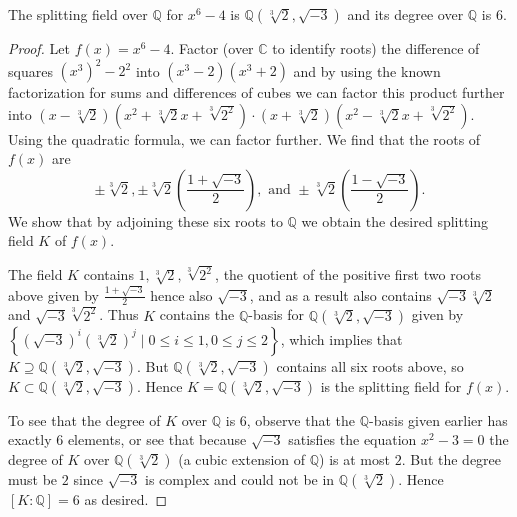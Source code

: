 \documentclass[11pt]{article}
\newcommand{\br}[1]{\left(#1\right)}
\newcommand{\cbr}[1]{\left\{#1\right\}}
\begin{document}
\begin{enumerate}
    The splitting field over $\mathbb{Q}$ for $x^6-4$ is $\mathbb{Q}(\sqrt[3]{2}, \sqrt{-3})$ and its degree over $\mathbb{Q}$ is $6$. \begin{proof}
        Let $f(x) = x^6-4$. Factor (over $\mathbb{C}$ to identify roots) the difference of squares $(x^3)^2-2^2$ into $(x^3-2)(x^3+2)$ and by using the known factorization for sums and differences of cubes we can factor this product further into $(x-\sqrt[3]{2})(x^2 + \sqrt[3]{2}x + \sqrt[3]{2^2})\cdot (x+\sqrt[3]{2})(x^2 - \sqrt[3]{2}x + \sqrt[3]{2^2})$. Using the quadratic formula, we can factor further. We find that the roots of $f(x)$ are \[\pm \sqrt[3]{2}, \pm\sqrt[3]{2}\br{\frac{1+\sqrt{-3}}{2}},\text{ and } \pm\sqrt[3]{2}\br{\frac{1-\sqrt{-3}}{2}}.\]
        We show that by adjoining these six roots to $\mathbb{Q}$ we obtain the desired splitting field $K$ of $f(x)$.
        
        The field $K$ contains $1, \sqrt[3]{2}, \sqrt[3]{2^2}$, the quotient of the positive first two roots above given by $\frac{1+\sqrt{-3}}{2}$ hence also $\sqrt{-3}$, and as a result also contains $\sqrt{-3}\sqrt[3]{2}$ and $\sqrt{-3}\sqrt[3]{2^2}$. Thus $K$ contains the $\mathbb{Q}$-basis for $\mathbb{Q}(\sqrt[3]{2}, \sqrt{-3})$ given by $\cbr{(\sqrt{-3})^i(\sqrt[3]{2})^j\mid 0\leq i\leq 1, 0\leq j\leq 2}$, which implies that $K\supseteq \mathbb{Q}(\sqrt[3]{2}, \sqrt{-3})$. But $\mathbb{Q}(\sqrt[3]{2}, \sqrt{-3})$ contains all six roots above, so $K\subset \mathbb{Q}(\sqrt[3]{2}, \sqrt{-3})$. Hence $K=\mathbb{Q}(\sqrt[3]{2}, \sqrt{-3})$ is the splitting field for $f(x)$.

        To see that the degree of $K$ over $\mathbb{Q}$ is $6$, observe that the $\mathbb{Q}$-basis given earlier has exactly $6$ elements, or see that because $\sqrt{-3}$ satisfies the equation $x^2-3 = 0$ the degree of $K$ over $\mathbb{Q}(\sqrt[3]{2})$ (a cubic extension of $\mathbb{Q}$) is at most $2$. But the degree must be $2$ since $\sqrt{-3}$ is complex and could not be in $\mathbb{Q}(\sqrt[3]{2})$. Hence $[K\colon \mathbb{Q}] = 6$ as desired.
    \end{proof}
\end{enumerate}
\end{document}
